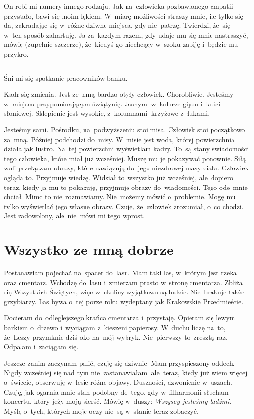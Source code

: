\documentclass[9pt, a5paper]{memoir}
\begin{document}
On robi mi numery innego rodzaju. Jak na~człowieka pozbawionego empatii przystało, bawi się moim lękiem. W~miarę możliwości straszy mnie, ile tylko się da, zakradając się w~różne dziwne miejsca, gdy nie~patrzę. Twierdzi, że~się w~ten sposób zahartuję. Ja za~każdym razem, gdy udaje mu się mnie nastraszyć, mówię (zupełnie szczerze), że~kiedyś go niechcący w~szoku zabiję i~będzie mu przykro.

\fancybreak{* \quad * \quad *}

Śni mi się spotkanie pracowników banku.

Kadr się zmienia. Jest ze~mną bardzo otyły człowiek. Chorobliwie. Jesteśmy w~miejscu przypominającym świątynię. Jasnym, w~kolorze gipsu i~kości słoniowej. Sklepienie jest wysokie, z~kolumnami, krzyżowe z~łukami.

Jesteśmy sami. Pośrodku, na~podwyższeniu stoi misa. Człowiek stoi początkowo za~mną. Później podchodzi do~misy. W~misie jest woda, której powierzchnia działa jak lustro. Na~tej powierzchni wyświetlam kadry. To~są stany świadomości tego człowieka, które miał już wcześniej. Muszę mu je pokazywać ponownie. Siłą woli przełączam obrazy, które nawiązują do~jego niezdrowej masy ciała. Człowiek ogląda to. Przyjmuje wiedzę. Widział to~wszystko już wcześniej, ale~dopiero teraz, kiedy ja mu to pokazuję, przyjmuje obrazy do~wiadomości. Tego ode~mnie chciał. Mimo to nie~rozmawiamy. Nie~możemy mówić o~problemie. Mogę mu tylko wyświetlać jego własne obrazy. Czuję, że~człowiek zrozumiał, o~co chodzi. Jest zadowolony, ale~nie~mówi mi tego wprost.

\newpage
\section{Wszystko ze mną dobrze}
Postanawiam pojechać na~spacer do~lasu. Mam taki las, w~którym jest rzeka oraz cmentarz. Wchodzę do~lasu i~zmierzam prosto w~stronę cmentarza. Zbliża się Wszystkich Świętych, więc w~okolicy wyjątkowo są ludzie. Nie~brakuje także grzybiarzy. Las bywa o~tej porze roku wydeptany jak Krakowskie Przedmieście.

Docieram do~odleglejszego krańca cmentarza i~przystaję. Opieram się lewym barkiem o~drzewo i~wyciągam z~kieszeni papierosy. W~duchu liczę na~to, że~Leszy przymknie dziś oko na~mój wybryk. Nie~pierwszy to~zresztą raz. Odpalam i~zaciągam się.

Jeszcze zanim zaczynam palić, czuję się dziwnie. Mam przyspieszony oddech. Nigdy wcześniej się nad tym nie~zastanawiałam, ale~teraz, kiedy już wiem więcej o~świecie, obserwuję w~lesie różne objawy. Duszności, dzwonienie w~uszach. Czuję, jak ogarnia mnie stan podobny do~tego, gdy w~filharmonii słucham koncertu, który jeży moją sierść. Mówię w~duszy: \textit{Wszyscy jesteśmy ludźmi}. Myślę o~tych, których moje oczy nie~są w~stanie teraz zobaczyć.
\end{document}
